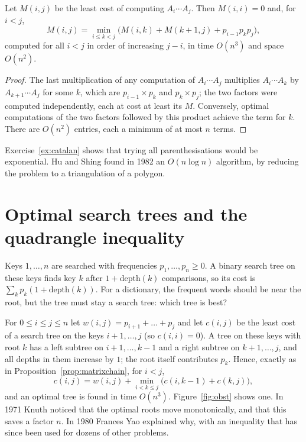 \begin{proposition}\label{prop:matrixchain}
Let $M(i,j)$ be the least cost of computing $A_i\cdots A_j$. Then $M(i,i)=0$ and, for $i<j$,
\[
M(i,j)=\min_{i\le k<j}\big(M(i,k)+M(k+1,j)+p_{i-1}p_kp_j\big),
\]
computed for all $i<j$ in order of increasing $j-i$, in time $O(n^3)$ and space $O(n^2)$.
\end{proposition}
\begin{proof}
The last multiplication of any computation of $A_i\cdots A_j$ multiplies $A_i\cdots A_k$ by $A_{k+1}\cdots A_j$ for some $k$, which are $p_{i-1}\times p_k$ and $p_k\times p_j$; the two factors were computed independently, each at cost at least
its $M$. Conversely, optimal computations of the two factors followed by this product achieve the term for $k$. There are $O(n^2)$ entries, each a minimum of at most $n$ terms.
\end{proof}

Exercise~\ref{ex:catalan} shows that trying all parenthesisations would be exponential. Hu and Shing found in 1982 an $O(n\log n)$ algorithm, by reducing the problem to a triangulation of a polygon.

\section{Optimal search trees and the quadrangle inequality}\label{sec:obst}

Keys $1,\dots,n$ are searched with frequencies $p_1,\dots,p_n\ge0$. A binary search tree on these keys finds key $k$ after $1+\mathrm{depth}(k)$ comparisons, so its cost is $\sum_kp_k(1+\mathrm{depth}(k))$. For a dictionary,
the frequent words should be near the root, but the tree must stay a search tree: which tree is best?

For $0\le i\le j\le n$ let $w(i,j)=p_{i+1}+\dots+p_j$ and let $c(i,j)$ be the least cost of a search tree on the keys $i+1,\dots,j$ (so $c(i,i)=0$). A tree on these keys with root $k$ has a left subtree on $i+1,\dots,k-1$ and a right subtree
on $k+1,\dots,j$, and all depths in them increase by $1$; the root itself contributes $p_k$. Hence, exactly as in Proposition~\ref{prop:matrixchain}, for $i<j$,
\begin{equation}\label{eq:obst}
c(i,j)=w(i,j)+\min_{i<k\le j}\big(c(i,k-1)+c(k,j)\big),
\end{equation}
and an optimal tree is found in time $O(n^3)$. Figure~\ref{fig:obst} shows one. In 1971 Knuth noticed that the optimal roots move monotonically, and that this saves a factor $n$. In 1980 Frances Yao explained why, with
an inequality that has since been used for dozens of other problems.

